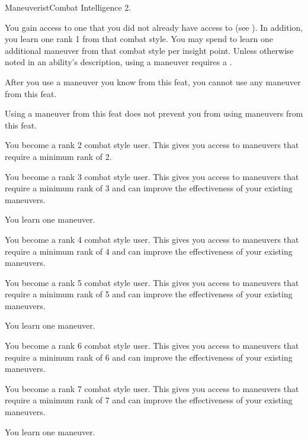     \begin{feat}{Maneuverist}{Combat}
        \featpre Intelligence 2.

         You gain access to one  that you did not already have access to (see ).
        In addition, you learn one rank 1  from that combat style.
        You may spend  to learn one additional maneuver from that combat style per insight point.
        Unless otherwise noted in an ability's description, using a maneuver requires a .

        After you use a maneuver you know from this feat, you  cannot use any maneuver from this feat.

         Using a maneuver from this feat does not prevent you from using maneuvers from this feat.

         You become a rank 2 combat style user.
        This gives you access to maneuvers that require a minimum rank of 2.

         You become a rank 3 combat style user.
        This gives you access to maneuvers that require a minimum rank of 3 and can improve the effectiveness of your existing maneuvers.

         You learn one maneuver.

         You become a rank 4 combat style user.
        This gives you access to maneuvers that require a minimum rank of 4 and can improve the effectiveness of your existing maneuvers.

         You become a rank 5 combat style user.
        This gives you access to maneuvers that require a minimum rank of 5 and can improve the effectiveness of your existing maneuvers.

         You learn one maneuver.

         You become a rank 6 combat style user.
        This gives you access to maneuvers that require a minimum rank of 6 and can improve the effectiveness of your existing maneuvers.

         You become a rank 7 combat style user.
        This gives you access to maneuvers that require a minimum rank of 7 and can improve the effectiveness of your existing maneuvers.

         You learn one maneuver.
    \end{feat}

